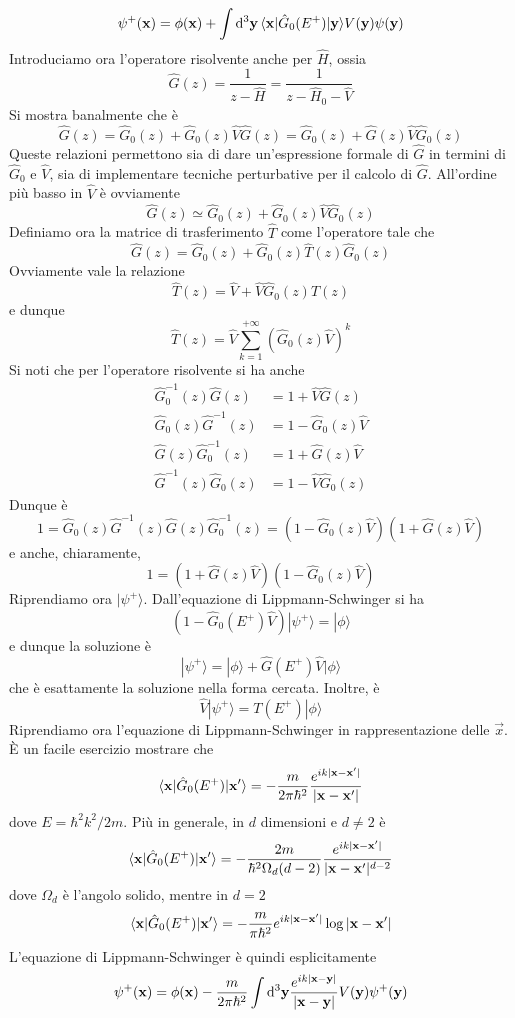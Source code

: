 \documentclass[a4paper, 11pt]{article}
\newcommand{\op}[1]{\hat{#1}}
\renewcommand{\op}[1]{\hat{#1}}
\newcommand{\ham}{\hat{H}}
\renewcommand{\ket}[1]{| #1\rangle}
\begin{document}
\[\psi^+(\vec{x})=\phi(\vec{x})+\int\d^3\vec{y}\,\braketop{\vec{x}}{\op G_0(E^+)}{\vec{y}}V(\vec{y})\psi(\vec{y})\] Introduciamo ora l'operatore risolvente anche per $\ham$, ossia
\[\op G(z)=\frac{1}{z-\ham}=\frac{1}{z-\ham_0-\op V}\]
Si mostra banalmente che è
\[\op G(z)=\op G_0(z)+\op G_0(z)\op V\op G(z)=\op G_0(z)+\op G(z)\op V\op G_0(z)\]
Queste relazioni permettono sia di dare un'espressione formale di $\op G$ in termini di $\op G_0$ e $\op V$, sia di implementare tecniche perturbative per il calcolo di $\op G$. All'ordine più basso in $\op V$ è ovviamente
\[\op G(z)\simeq\op G_0(z)+\op G_0(z)\op V\op G_0(z)\]
Definiamo ora la matrice di trasferimento $\op T$ come l'operatore tale che
\[\op G(z)=\op G_0(z)+\op G_0(z)\op T(z)\op G_0(z)\]
Ovviamente vale la relazione
\[\op T(z)=\op V+\op V\op G_0(z)\op T(z)\]
e dunque
\[\op T(z)=\op V\sum_{k=1}^{+\infty}(\op G_0(z)\op V)^k\]
Si noti che per l'operatore risolvente si ha anche
\begin{align*}
	\op G_0^{-1}(z)\op G(z)&=1+\op V\op G(z)\\\op G_0(z)\op G^{-1}(z)&=1-\op G_0(z)\op V\\\op G(z)\op G_0^{-1}(z)&=1+\op G(z)\op V\\\op G^{-1}(z)\op G_0(z)&=1-\op V\op G_0(z)
\end{align*}
Dunque è
\[1=\op G_0(z)\op G^{-1}(z)\op G(z)\op G_0^{-1}(z)=(1-\op G_0(z)\op V)(1+\op G(z)\op V)\]
e anche, chiaramente,
\[1=(1+\op G(z)\op V)(1-\op G_0(z)\op V)\]
Riprendiamo ora $\ket{\psi^+}$. Dall'equazione di Lippmann-Schwinger si ha
\[(1-\op G_0(E^+)\op V)\ket{\psi^+}=\ket{\phi}\]
e dunque la soluzione è
\[\ket{\psi^+}=\ket{\phi}+\op G(E^+)\op V\ket{\phi}\]
che è esattamente la soluzione nella forma cercata. Inoltre, è
\[\op V\ket{\psi^+}=T(E^+)\ket{\phi}\]
Riprendiamo ora l'equazione di Lippmann-Schwinger in rappresentazione delle $\vec{x}$. \`{E} un facile esercizio mostrare che
\[\braketop{\vec{x}}{\op G_0(E^+)}{\vec{x}'}=-\frac{m}{2\pi\hbar^2}\frac{e^{ik|\vec{x}-\vec{x}'|}}{|\vec{x}-\vec{x}'|}\]
dove $E=\hbar^2k^2/2m$. Più in generale, in $d$ dimensioni e $d\neq2$ è
\[\braketop{\vec{x}}{\op G_0(E^+)}{\vec{x}'}=-\frac{2m}{\hbar^2\Omega_d(d-2)}\frac{e^{ik|\vec{x}-\vec{x}'|}}{|\vec{x}-\vec{x}'|^{d-2}}\]
dove $\Omega_d$ è l'angolo solido, mentre in $d=2$
\[\braketop{\vec{x}}{\op G_0(E^+)}{\vec{x}'}=-\frac{m}{\pi\hbar^2}{e^{ik|\vec{x}-\vec{x}'|}}\log{|\vec{x}-\vec{x}'|}\]
L'equazione di Lippmann-Schwinger è quindi esplicitamente
\[\psi^+(\mathbf{x})=\phi(\mathbf{x})-\frac{m}{2\pi\hbar^2}\int\mathrm{d}^3\mathbf{y}\frac{e^{ik|\mathbf{x}-\mathbf{y}|}}{|\mathbf{x}-\mathbf{y}|}V(\mathbf{y})\psi^+(\mathbf{y})\]
\end{document}
